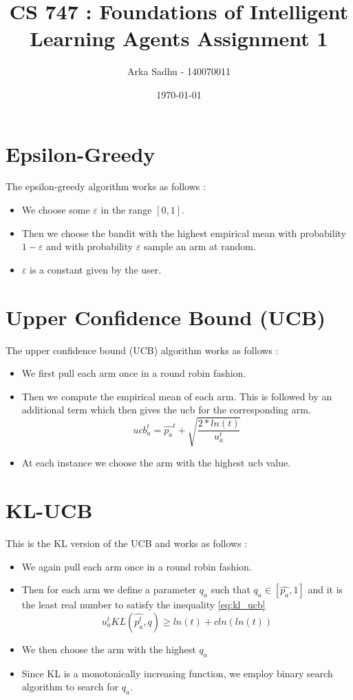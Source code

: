\documentclass{article}
\title{CS 747 : Foundations of Intelligent Learning Agents Assignment 1}
\author{Arka Sadhu - 140070011}
\date{\today}
\begin{document}
\maketitle

\section{Epsilon-Greedy}
The epsilon-greedy algorithm works as follows :
\begin{itemize}
\item We choose some $\varepsilon$ in the range $[0,1]$.
\item Then we choose the bandit with the highest empirical mean with probability $1 - \varepsilon$ and with probability $\varepsilon$ sample an arm at random.
\item $\varepsilon$ is a constant given by the user.
\end{itemize}

\section{Upper Confidence Bound (UCB)}
The upper confidence bound (UCB) algorithm works as follows :
\begin{itemize}
\item We first pull each arm once in a round robin fashion.
\item Then we compute the empirical mean of each arm. This is followed by an additional term which then gives the ucb for the corresponding arm.
  $$ ucb_a^t = \hat{p_a}^t + \sqrt{\frac{2 * ln(t)}{u_a^{t}}}$$
\item At each instance we choose the arm with the highest ucb value.
\end{itemize}

\section{KL-UCB}
This is the KL version of the UCB and works as follows :
\begin{itemize}
\item We again pull each arm once in a round robin fashion.
\item Then for each arm we define a parameter $q_a$ such that $q_a \in [\hat{p_a},1]$ and it is the least real number to satisfy the inequality \ref{eq:kl_ucb}
  \begin{equation}
    \label{eq:kl_ucb}
    u_a^t KL(\hat{p_a^t}, q) \ge ln(t) + cln(ln(t))
  \end{equation}
\item We then choose the arm with the highest $q_a$
\item Since KL is a monotonically increasing function, we employ binary search algorithm to search for $q_a$.
\end{itemize}
\end{document}
